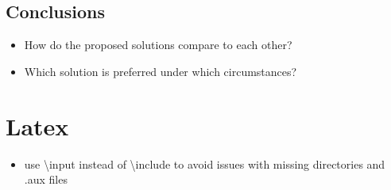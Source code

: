 \hypertarget{conclusions}{%
\section{Conclusions}\label{conclusions}}

\begin{itemize}
\tightlist
\item
  How do the proposed solutions compare to each other?
\item
  Which solution is preferred under which circumstances?
\end{itemize}

\hypertarget{latex}{%
\chapter{Latex}\label{latex}}

\begin{itemize}
\tightlist
\item
  use \textbackslash input instead of \textbackslash include to avoid
  issues with missing directories and .aux files
\end{itemize}
